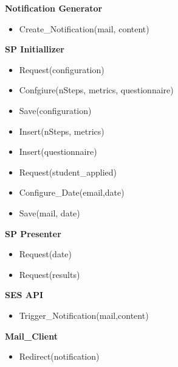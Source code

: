 	\textbf{Notification Generator}
	\begin{itemize}
		\item Create\_Notification(mail, content)
		
	\end{itemize}
	
	\textbf{SP Initiallizer}
	\begin{itemize}
		\item Request(configuration)
		\item Confgiure(nSteps, metrics, questionnaire)
		\item Save(configuration)
		\item Insert(nSteps, metrics)
		\item Insert(questionnaire)
		\item Request(student\_applied)
		\item Configure\_Date(email,date)
		\item Save(mail, date)
	\end{itemize}
	
	\textbf{SP Presenter}
	\begin{itemize}
		\item Request(date)
		\item Request(results)
	\end{itemize}
	
	\textbf{SES API}
	\begin{itemize}
		\item Trigger\_Notification(mail,content)
	\end{itemize}
	
	\textbf{Mail\_Client}
	\begin{itemize}
		\item Redirect(notification)
	\end{itemize}
	
